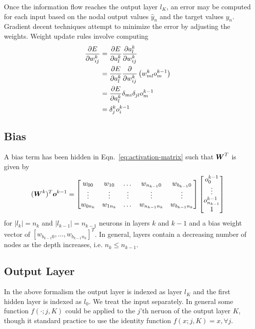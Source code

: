 \documentclass[12pt,notitlepage]{article}
\begin{document}
Once the information flow reaches the output layer $l_{K}$, an error
may be computed for each input based on the nodal output values
$\hat{y}_{n}$ and the target values $y_{n}$.  Gradient decent
techniques attempt to minimize the error by adjusting the weights.
Weight update rules involve computing
\begin{equation}
  \label{eq:error-grad}
  \begin{split}
    \frac{\partial E}{\partial w^{k}_{ij}} &=
    \frac{\partial E}{\partial a_{l}^{k}}\frac{\partial a_{l}^{k}}{\partial w_{ij}^{k}}\\
    &= \frac{\partial E}{\partial a_{l}^{k}} \frac{\partial }{\partial w_{ij}^{k}}\left( w_{ml}^{k}o^{k-1}_{m} \right)\\
    &= \frac{\partial E}{\partial a_{l}^{k}}\delta_{mi}\delta_{jl}o_{m}^{k-1}\\
    &= \delta_{j}^{k}o_{i}^{k-1}
  \end{split}
\end{equation}

\subsection{Bias}
\label{sec:bias}
A bias term has been hidden in Eqn.~\ref{eq:activation-matrix} such
that $\boldsymbol{W}^{T}$ is given by
\begin{equation}
  \label{eq:wmat-explicit}
  (\boldsymbol{W}^{k})^{T}\boldsymbol{o}^{k-1} =
  \begin{bmatrix}
    w_{00} & w_{10} & \dots & w_{n_{k-1}0} & w_{b_{k-1}0} \\
    \vdots & \vdots & \vdots & \vdots & \vdots \\
    w_{0n_{k}} & w_{1n_{k}} & \dots & w_{n_{k-1}n_{k}} & w_{b_{k-1}n_{k}}
  \end{bmatrix}
  \begin{bmatrix}
    o_{0}^{k-1}\\
    \vdots\\
    o_{n_{k-1}}^{k-1}\\
    1
  \end{bmatrix}
\end{equation}
for $|l_{k}|=n_{k}$ and $|l_{k-1}|=n_{k-1}$ neurons in layers $k$ and $k-1$ and a bias
weight vector of $[w_{b_{k-1}0},\dots,w_{b_{k-1}n_{k}}]^{T}$.  In
general, layers contain a decreasing number of nodes as the depth
increases, i.e. $n_{k} \le n_{k-1}$.

\subsection{Output Layer}
\label{sec:output-layer}
In the above formalism the output layer is indexed as layer $l_{K}$
and the first hidden layer is indexed as $l_{0}$.  We treat the input
separately.  In general some function $f(\cdot;j,K)$ could be applied to
the $j$'th neruon of the output layer $K$, though it standard practice to use the identity function
$f(x;j,K) = x, \forall j$.
\end{document}
